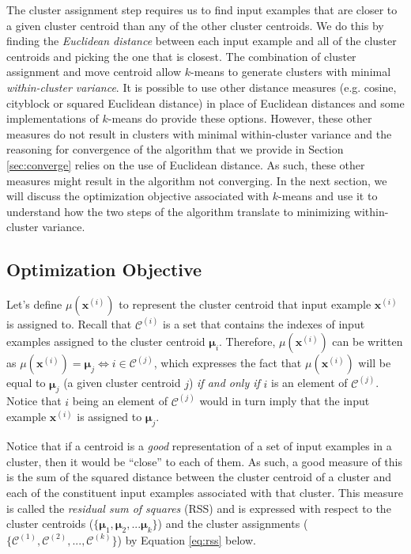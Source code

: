 The cluster assignment step requires us to find input examples that are closer to a given cluster centroid than any of the other cluster centroids. We do this by finding the \emph{Euclidean distance} between each input example and all of the cluster centroids and picking the one that is closest. The combination of cluster assignment and move centroid allow $k$-means to generate clusters with minimal \emph{within-cluster variance}. It is possible to use other distance measures (e.g. cosine, cityblock or squared Euclidean distance) in place of Euclidean distances and some implementations of $k$-means 
do provide these options. However, these other measures do not result in clusters with minimal within-cluster variance and the reasoning for convergence of the algorithm that we provide in Section \ref{sec:converge} relies on the use of Euclidean distance. As such, these other measures might result in the algorithm not converging.
In the next section, we will discuss the optimization objective associated with $k$-means and use it to understand how the two steps of the algorithm translate to minimizing within-cluster variance. 

\subsection{Optimization Objective}
\label{section:optimization-objective}

Let's define $\mu(\mathbf{x}^{(i)})$ to represent the cluster centroid that input example $\mathbf{x}^{(i)}$ is assigned to. Recall that $\mathcal{C}^{(i)}$ is a set that contains the indexes of input examples assigned to the cluster centroid $\bm{\mu}_i$. Therefore, $\mu(\mathbf{x}^{(i)})$ can be written as $\mu(\mathbf{x}^{(i)}) = \bm{\mu}_j \iff i \in \mathcal{C}^{(j)}$, which expresses the fact that $\mu(\mathbf{x}^{(i)})$ will be equal to $\bm{\mu}_j$ (a given cluster centroid $j$) \emph{if and only if} $i$ is an element of $\mathcal{C}^{(j)}$. Notice that $i$ being an element of $\mathcal{C}^{(j)}$ would in turn imply that the input example $\mathbf{x}^{(i)}$ is assigned to $\bm{\mu}_j$. 

Notice that if a centroid is a \emph{good} representation of a set of input examples in a cluster, then it would be ``close'' to each of them. As such, a good measure of this is the sum of the squared distance between the cluster centroid of a cluster and each of the constituent input examples associated with that cluster. This measure is called the \emph{residual sum of squares} (RSS) and is expressed with respect to the cluster centroids ($\{ \bm{\mu}_1, \bm{\mu}_2, ... \bm{\mu}_k\}$) and the cluster assignments ($\{\mathcal{C}^{(1)}, \mathcal{C}^{(2)}, ..., \mathcal{C}^{(k)}\}$) by Equation \ref{eq:rss} below.

